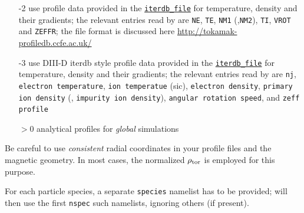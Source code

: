 \documentclass[12pt]{article}
\begin{document}
\begin{description}
\begin{itemize}
 \item[-2] use profile data provided in the \hyperlink{iterdb_file}{\tt iterdb\_file} 
  for temperature, density and their gradients; the relevant entries read by \gene are {\tt NE},
  {\tt TE}, {\tt NM1} (,{\tt NM2}), {\tt TI}, {\tt VROT} and {\tt ZEFFR}; the file format is discussed
  here \url{http://tokamak-profiledb.ccfe.ac.uk/}
 \item[-3] use DIII-D iterdb style profile data provided in the
  \hyperlink{iterdb_file}{\tt iterdb\_file} for temperature, density and their gradients;
  the relevant entries read by \gene are {\tt nj}, {\tt electron temperature}, {\tt ion temperatue}
  (sic), {\tt electron density}, {\tt primary ion density} (, {\tt impurity ion density}),
  {\tt angular rotation speed}, and {\tt zeff profile}
 \item[$>0$] analytical profiles for {\em global} simulations
\end{itemize}
Be careful to use {\em consistent} radial coordinates in your profile files and the magnetic geometry. In most cases, the normalized $\rho_{\rm tor}$ is employed for this purpose.
\end{description}
For each particle species, a separate \texttt{species} namelist has to be provided; \gene will then use
the first \texttt{nspec} such namelists, ignoring others (if present).
\end{document}
